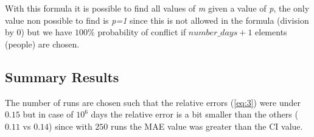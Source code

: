 \documentclass[twocolumn,letterpaper]{report}
\begin{document}
{		With this formula it is possible to find all values of \emph{m} given a value of \emph{p}, the only value non possible to find is \emph{p=1} since this is not allowed in the formula (division by 0) but we have $100\%$ probability of conflict if $number\_days+1$ elements (people) are chosen.
		
		\subsection{Summary Results}
				\begin{table}[h]
				\renewcommand{\arraystretch}{1.05}
				\end{table}
			The number of runs are chosen such that the relative errors (\ref{eq:3}) were under $0.15$ but in case of $10^6$ days the relative error is a bit smaller than the others ($0.11$ vs $0.14$) since with $250$ runs the MAE value was greater than the CI value.
} \fi
			
\end{document}
